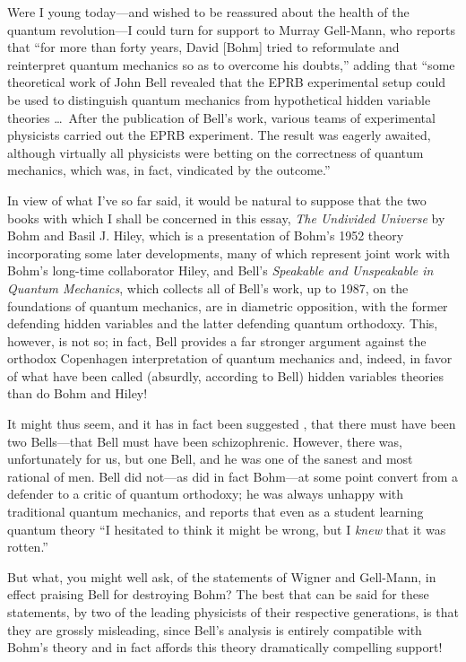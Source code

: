 \documentclass[12pt]{article}
\begin{document}
Were I young today---and wished to be reassured about the health of the
quantum revolution---I could turn for support to Murray Gell-Mann, who
reports \cite{GM} that ``for more than forty years, David [Bohm] tried to
reformulate and reinterpret quantum mechanics so as to overcome his
doubts,'' adding that ``some theoretical work of John Bell revealed that
the EPRB experimental setup could be used to distinguish quantum mechanics
{}from hypothetical hidden variable theories \dots\  After the publication of
Bell's work, various teams of experimental physicists carried out the EPRB
experiment. The result was eagerly awaited, although virtually all
physicists were betting on the correctness of quantum mechanics, which was,
in fact, vindicated by the outcome.''

In view of what I've so far said, it would be natural to suppose that the
two books with which I shall be concerned in this essay, {\it The Undivided
Universe} by Bohm and Basil J. Hiley, which is a presentation of Bohm's
1952 theory incorporating some later developments, many of which represent
joint work with Bohm's long-time collaborator Hiley, and Bell's {\it
Speakable and Unspeakable in Quantum Mechanics}, which collects all of
Bell's work, up to 1987, on the foundations of quantum mechanics, are in
diametric opposition, with the former defending hidden variables and the
latter defending quantum orthodoxy. This, however, is not so; in fact, Bell
provides a far stronger argument against the orthodox Copenhagen
interpretation of quantum mechanics and, indeed, in favor of what have been
called (absurdly, according to Bell) hidden variables theories than do Bohm
and Hiley!

It might thus seem, and it has in fact been suggested \cite{Speiser}, that
there must have been two Bells---that Bell must have been
schizophrenic. However, there was, unfortunately for us, but one Bell, and
he was one of the sanest and most rational of men. Bell did not---as did in
fact Bohm---at some point convert from a defender to a critic of quantum
orthodoxy; he was always unhappy with traditional quantum mechanics, and
reports \cite{Bernstein} that even as a student learning quantum theory ``I
hesitated to think it might be wrong, but I {\it knew} that it was
rotten.''

But what, you might well ask, of the statements of Wigner and Gell-Mann, in
effect praising Bell for destroying Bohm?  The best that can be said for
these statements, by two of the leading physicists of their respective
generations, is that they are grossly misleading, since Bell's analysis is
entirely compatible with Bohm's theory and in fact affords this theory
dramatically compelling support!
\end{document}
